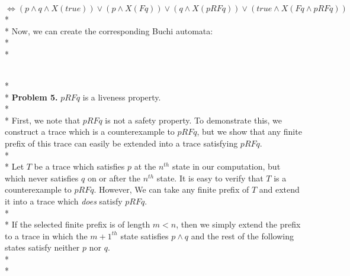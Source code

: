 \documentclass[12pt]{article}
\begin{document}
$\Longleftrightarrow(p\wedge q\wedge X(true))\vee(p\wedge X(Fq))\vee(q\wedge X(pRFq))\vee(true\wedge X(Fq\wedge pRFq))$\\*\\*
Now, we can create the corresponding Buchi automata:\\*\\*
\\*\\*
\textbf{Problem 5.} $pRFq$ is a liveness property.\\*\\*
First, we note that $pRFq$ is not a safety property. To demonstrate this, we construct a trace which is a counterexample to $pRFq$, but we show that any finite prefix of this trace can easily be extended into a trace satisfying $pRFq$.\\*\\*
Let $T$ be a trace which satisfies $p$ at the $n^{th}$ state in our computation, but which never satisfies $q$ on or after the $n^{th}$ state. It is easy to verify that $T$ is a counterexample to $pRFq$. However, We can take any finite prefix of $T$ and extend it into a trace which \textit{does} satisfy $pRFq$.\\*\\*
If the selected finite prefix is of length $m<n$, then we simply extend the prefix to a trace in which the $m+1^{th}$ state satisfies $p\wedge q$ and the rest of the following states satisfy neither $p$ nor $q$.\\*\\*
\end{document}
